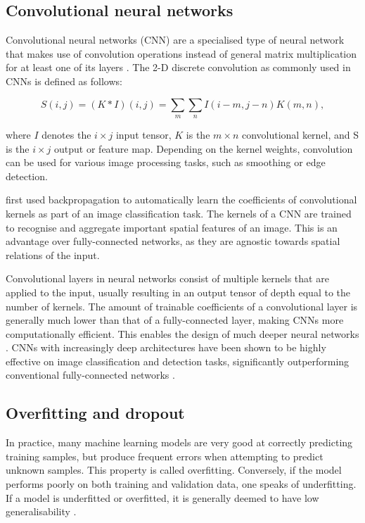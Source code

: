 \documentclass{l4proj}
\begin{document}
\subsection{Convolutional neural networks}

Convolutional neural networks (CNN) are a specialised type of neural network that makes use of convolution operations instead of general matrix multiplication for at least one of its layers \citep{goodfellow_deep_2016}. The 2-D discrete convolution as commonly used in CNNs is defined as follows:

\begin{equation}
  S(i, j) = (K \ast I) (i, j) = \sum_m \sum_n I(i-m, j-n) K(m, n),
\end{equation}

where $I$ denotes the $i \times j$ input tensor, $K$ is the $m \times n$ convolutional kernel, and S is the $i \times j$ output or feature map. Depending on the kernel weights, convolution can be used for various image processing tasks, such as smoothing or edge detection.

\citet{lecun_backpropagation_1989} first used backpropagation to automatically learn the coefficients of convolutional kernels as part of an image classification task. The kernels of a CNN are trained to recognise and aggregate important spatial features of an image. This is an advantage over fully-connected networks, as they are agnostic towards spatial relations of the input.

Convolutional layers in neural networks consist of multiple kernels that are applied to the input, usually resulting in an output tensor of depth equal to the number of kernels. The amount of trainable coefficients of a convolutional layer is generally much lower than that of a fully-connected layer, making CNNs more computationally efficient. This enables the design of much deeper neural networks \citep{goodfellow_deep_2016}. CNNs with increasingly deep architectures have been shown to be highly effective on image classification and detection tasks, significantly outperforming conventional fully-connected networks \citep{krizhevsky_imagenet_2012, szegedy_going_2015, he_deep_2016}.


\subsection{Overfitting and dropout}

In practice, many machine learning models are very good at correctly predicting training samples, but produce frequent errors when attempting to predict unknown samples. This property is called overfitting. Conversely, if the model performs poorly on both training and validation data, one speaks of underfitting. If a model is underfitted or overfitted, it is generally deemed to have low generalisability \citep{burkov_hundred-page_2019}. 
\end{document}
